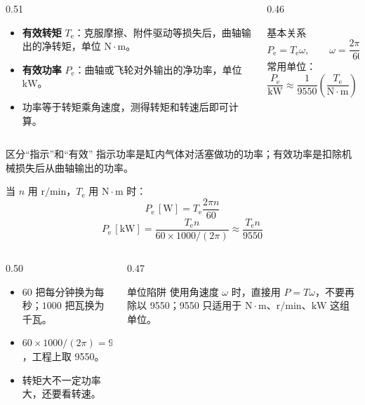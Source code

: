 \begin{frame}[t,shrink]{}
\begin{columns}[T,onlytextwidth]
\begin{column}{0.51\textwidth}
  \begin{itemize}
    \item \textbf{有效转矩} \(T_{\mathrm{e}}\)：克服摩擦、附件驱动等损失后，曲轴输出的净转矩，单位 \(\mathrm{N\cdot m}\)。
    \item \textbf{有效功率} \(P_{\mathrm{e}}\)：曲轴或飞轮对外输出的净功率，单位 \(\mathrm{kW}\)。
    \item 功率等于转矩乘角速度，测得转矩和转速后即可计算。
  \end{itemize}
\end{column}
\begin{column}{0.46\textwidth}
  \begin{keybox}{基本关系}
  \small
  $$
  P_{\mathrm{e}}=T_{\mathrm{e}}\omega,
  \qquad
  \omega=\frac{2\pi n}{60}
  $$
  常用单位：
  $$
  \frac{P_{\mathrm{e}}}{\mathrm{kW}}
  \approx\frac{1}{9550}
  \left(\frac{T_{\mathrm{e}}}{\mathrm{N\cdot m}}\right)
  \left(\frac{n}{\mathrm{r/min}}\right)
  $$
  \end{keybox}
\end{column}
\end{columns}
\vspace{0.5mm}
\begin{amberbox}{区分“指示”和“有效”}
\small 指示功率是缸内气体对活塞做功的功率；有效功率是扣除机械损失后从曲轴输出的功率。
\end{amberbox}
\end{frame}

\begin{frame}[t,shrink]{}
当 \(n\) 用 \(\mathrm{r/min}\)，\(T_{\mathrm{e}}\) 用 \(\mathrm{N\cdot m}\) 时：
$$
P_{\mathrm{e}}\,[\mathrm{W}]
=T_{\mathrm{e}}\frac{2\pi n}{60}
$$
$$
P_{\mathrm{e}}\,[\mathrm{kW}]
=\frac{T_{\mathrm{e}}n}{60\times1000/(2\pi)}
\approx\frac{T_{\mathrm{e}}n}{9550}
$$
\begin{columns}[T,onlytextwidth]
\begin{column}{0.50\textwidth}
  \begin{itemize}
    \item \(60\) 把每分钟换为每秒；\(1000\) 把瓦换为千瓦。
    \item \(60\times1000/(2\pi)=9549.3\ldots\)，工程上取 9550。
    \item 转矩大不一定功率大，还要看转速。
  \end{itemize}
\end{column}
\begin{column}{0.47\textwidth}
  \begin{amberbox}{单位陷阱}
  \small 使用角速度 \(\omega\) 时，直接用 \(P=T\omega\)，不要再除以 9550；9550 只适用于 \(\mathrm{N\cdot m}\)、\(\mathrm{r/min}\)、\(\mathrm{kW}\) 这组单位。
  \end{amberbox}
\end{column}
\end{columns}
\end{frame}

